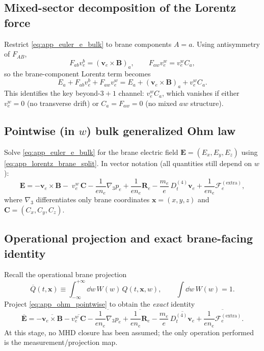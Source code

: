 \documentclass[11pt]{article}
\begin{document}
\subsection{Mixed-sector decomposition of the Lorentz force}
\label{app:ohm_mixed_decomp}

Restrict \eqref{eq:app_euler_e_bulk} to brane components \(A=a\). Using antisymmetry of \(F_{AB}\),
\begin{equation}
F_{ab}v_e^b = (\mathbf{v}_e\times\mathbf{B})_a,
\qquad
F_{aw}v_e^w = v_e^w C_a,
\label{eq:app_F_split}
\end{equation}
so the brane-component Lorentz term becomes
\begin{equation}
E_a + F_{ab}v_e^b + F_{aw}v_e^w
=
E_a + (\mathbf{v}_e\times\mathbf{B})_a + v_e^w C_a.
\label{eq:app_lorentz_brane_split}
\end{equation}
This identifies the key beyond-\(3+1\) channel: \(v_e^w C_a\), which vanishes if either
\(v_e^w=0\) (no transverse drift) or \(C_a=F_{aw}=0\) (no mixed \(aw\) structure).

\subsection{Pointwise (in \texorpdfstring{\(w\)}{w}) bulk generalized Ohm law}
\label{app:ohm_pointwise}

Solve \eqref{eq:app_euler_e_bulk} for the brane electric field \(\mathbf{E}=(E_x,E_y,E_z)\) using
\eqref{eq:app_lorentz_brane_split}. In vector notation (all quantities still depend on \(w\)):
\begin{equation}
\mathbf{E}
=
-\mathbf{v}_e\times\mathbf{B}
-\;v_e^w\,\mathbf{C}
-\frac{1}{e n_e}\nabla_3 p_e
+\frac{1}{e n_e}\mathbf{R}_e
-\frac{m_e}{e}\,D_t^{(4)}\mathbf{v}_e
+\frac{1}{e n_e}\boldsymbol{\mathcal{F}}^{(\mathrm{extra})}_e,
\label{eq:app_ohm_pointwise}
\end{equation}
where \(\nabla_3\) differentiates only brane coordinates \(\mathbf{x}=(x,y,z)\) and
\(\mathbf{C}=(C_x,C_y,C_z)\).

\subsection{Operational projection and exact brane-facing identity}
\label{app:ohm_project_exact}

Recall the operational brane projection
\begin{equation}
\overline{Q}(t,\mathbf{x}) \equiv \int_{-\infty}^{+\infty}\dd w\,W(w)\,Q(t,\mathbf{x},w),
\qquad
\int \dd w\,W(w)=1.
\label{eq:app_proj_def_ohm}
\end{equation}
Project \eqref{eq:app_ohm_pointwise} to obtain the \emph{exact} identity
\begin{equation}
\overline{\mathbf{E}}
=
-\overline{\mathbf{v}_e\times\mathbf{B}}
-\overline{v_e^w\,\mathbf{C}}
-\overline{\frac{1}{e n_e}\nabla_3 p_e}
+\overline{\frac{1}{e n_e}\mathbf{R}_e}
-\frac{m_e}{e}\,\overline{D_t^{(4)}\mathbf{v}_e}
+\overline{\frac{1}{e n_e}\boldsymbol{\mathcal{F}}^{(\mathrm{extra})}_e}.
\label{eq:app_ohm_projected_exact}
\end{equation}
At this stage, no MHD closure has been assumed; the only operation performed is the
measurement/projection map.
\end{document}
